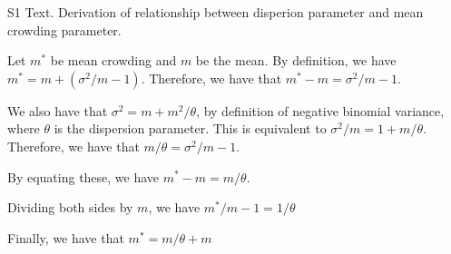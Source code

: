 S1 Text. Derivation of relationship between disperion parameter and mean crowding parameter. 

Let $m^*$ be mean crowding and $m$ be the mean. By definition, we have $m^* = m +(\sigma^2/m -1)$. 
Therefore, we have that $m^*- m = \sigma^2/m -1$.

We also have that $\sigma^2 = m + m^2/\theta$, by definition of negative binomial variance, where $\theta$ is the dispersion parameter. This is equivalent to $\sigma^2/m = 1 + m/\theta$.
Therefore, we have that $m/\theta = \sigma^2/m - 1$.

By equating these, we have $m^*- m = m/\theta$. 

Dividing both sides by $m$, we have $m^*/m - 1 = 1/\theta$

Finally, we have that $m^*= m/\theta + m$
